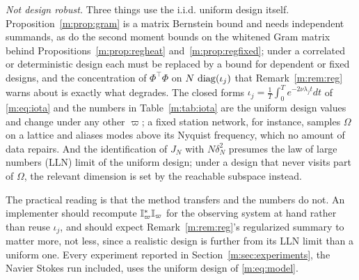 \emph{Not design robust.} Three things use the i.i.d. uniform design itself. Proposition~\ref{m:prop:gram} is a matrix Bernstein bound and needs independent summands, as do the second moment bounds on the whitened Gram matrix behind Propositions~\ref{m:prop:regheat} and~\ref{m:prop:regfixed}; under a correlated or deterministic design each must be replaced by a bound for dependent or fixed designs, and the concentration of $\Phi^\top\Phi$ on $N\,\operatorname{diag}(\iota_j)$ that Remark~\ref{m:rem:reg} warns about is exactly what degrades. The closed forms $\iota_j=\tfrac1T\int_0^Te^{-2\nu\lambda_jt}dt$ of \eqref{m:eq:iota} and the numbers in Table~\ref{m:tab:iota} are the uniform design values and change under any other $\varpi$; a fixed station network, for instance, samples $\Omega$ on a lattice and aliases modes above its Nyquist frequency, which no amount of data repairs. And the identification of $J_N$ with $N\delta_N^2$ presumes the law of large numbers (LLN) limit of the uniform design; under a design that never visits part of $\Omega$, the relevant dimension is set by the reachable subspace instead.

The practical reading is that the method transfers and the numbers do not. An implementer should recompute $\mathbb{I}^*_\varpi\mathbb{I}_\varpi$ for the observing system at hand rather than reuse $\iota_j$, and should expect Remark~\ref{m:rem:reg}'s regularized summary to matter more, not less, since a realistic design is further from its LLN limit than a uniform one. Every experiment reported in Section~\ref{m:sec:experiments}, the Navier Stokes run included, uses the uniform design of \eqref{m:eq:model}.
